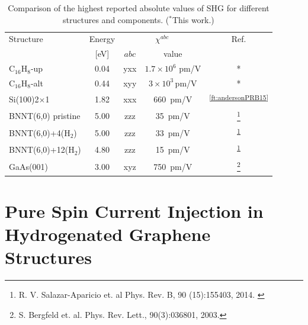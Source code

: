 \documentclass{beamer}
\begin{document}
\begin{frame}

\begin{table}[htb]%
\centering
\begin{tabular}{lcccc}
\hline
\hline
Structure & \hspace{-5mm}Energy & \multicolumn{2}{c}{$\chi^{abc} $} &  Ref.\\
\cline{3-4} & \hspace{-5mm}[eV] & $abc$ & value \\
\hline
C$_{16}$H$_{8}$-up    &  0.04  & yxx   & $1.7\times10^{6}$ \scriptsize{pm/V}  &*     \\
C$_{16}$H$_{8}$-alt   &  0.44  & xyy   & $3\times10^{3}$\,\scriptsize{pm/V}  & *     \\
Si(100)2$\times$1     &  1.82  & xxx   & 660\, \scriptsize{pm/V}  & 
\textsuperscript{\ref{ft:andersonPRB15}}  \\
BNNT(6,0) pristine    &  5.00  & zzz   & 35\,  \scriptsize{pm/V}  & 
\footnote[frame]{\tiny R. V. Salazar-Aparicio et. al Phys. Rev. B, 90
(15):155403, 2014. \label{ft:salazarPRB14}} \\
BNNT(6,0)+4(H$_{2}$)  &  5.00  & zzz   & 33\,  \scriptsize{pm/V}  & 
\textsuperscript{\ref{ft:salazarPRB14}} \\
BNNT(6,0)+12(H$_{2}$) &  4.80  & zzz   & 15\,  \scriptsize{pm/V}  &
\textsuperscript{\ref{ft:salazarPRB14}} \\
GaAs(001)     &  3.00  & xyz   & 750\, \scriptsize{pm/V}  & 
\footnote[frame]{\tiny S. Bergfeld et. al. Phys. Rev. Lett., 90(3):036801,
2003.} \\
\hline
\hline
\end{tabular}
\caption[]{%
Comparison of the highest reported absolute values of SHG for 
different structures and components. ($^{*}$This work.)}
\label{tab:shgcomp}
\end{table}


\end{frame}




\section{Pure Spin Current Injection in Hydrogenated Graphene Structures} 
\end{document}
